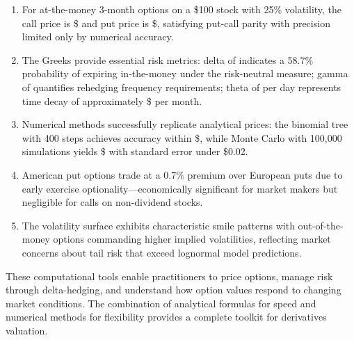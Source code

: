 \documentclass[a4paper, 11pt]{article}
\begin{document}
\begin{enumerate}
\item For at-the-money 3-month options on a \$100 stock with 25\% volatility, the call price is \$ and put price is \$, satisfying put-call parity with precision limited only by numerical accuracy.

\item The Greeks provide essential risk metrics: delta of  indicates a 58.7\% probability of expiring in-the-money under the risk-neutral measure; gamma of  quantifies rehedging frequency requirements; theta of  per day represents time decay of approximately \$ per month.

\item Numerical methods successfully replicate analytical prices: the binomial tree with 400 steps achieves accuracy within \$, while Monte Carlo with 100,000 simulations yields \$ with standard error under \$0.02.

\item American put options trade at a 0.7\% premium over European puts due to early exercise optionality—economically significant for market makers but negligible for calls on non-dividend stocks.

\item The volatility surface exhibits characteristic smile patterns with out-of-the-money options commanding higher implied volatilities, reflecting market concerns about tail risk that exceed lognormal model predictions.
\end{enumerate}

These computational tools enable practitioners to price options, manage risk through delta-hedging, and understand how option values respond to changing market conditions. The combination of analytical formulas for speed and numerical methods for flexibility provides a complete toolkit for derivatives valuation.
\end{document}
